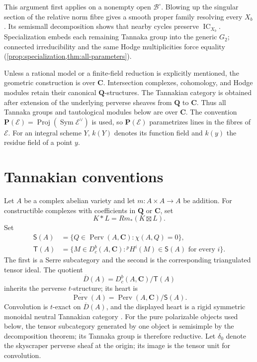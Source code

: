 \documentclass[10pt]{amsart}
\numberwithin{equation}{section}
\theoremstyle{definition}
\theoremstyle{remark}
\newcommand{\CC}{\mathbf C}
\newcommand{\QQ}{\mathbf Q}
\newcommand{\PP}{\mathbf P}
\newcommand{\IC}{\operatorname{IC}}
\newcommand{\cB}{\mathcal B}
\newcommand{\bo}{\boxtimes}
\begin{document}
This argument first applies on a nonempty open $\cB^\circ$.
Blowing up the singular section of the relative norm fibre gives a smooth
proper family resolving every $X_b$.  Its semismall decomposition shows
that nearby cycles preserve $\IC_{X_b}$.  Specialization embeds each
remaining Tannaka group into the generic $G_2$; connected irreducibility
and the same Hodge multiplicities force equality
(\cref{prop:specialization,thm:all-parameters}).

Unless a rational model or a finite-field reduction is explicitly mentioned,
the geometric construction is over $\CC$.  Intersection complexes,
cohomology, and Hodge modules retain their canonical $\QQ$-structures.  The
Tannakian category is obtained after extension of the underlying perverse
sheaves from $\QQ$ to $\CC$.  Thus all Tannaka groups and tautological
modules below are over $\CC$.
The convention $\PP(\mathcal E)=\operatorname{Proj}(\operatorname{Sym}\mathcal E^\vee)$ is used,
so $\PP(\mathcal E)$ parametrizes lines in the fibres of $\mathcal E$.  For
an integral scheme $Y$, $k(Y)$ denotes its function field and $k(y)$ the
residue field of a point $y$.

\section{Tannakian conventions}

Let $A$ be a complex abelian variety and let $m:A\times A\to A$ be addition.
For constructible complexes with coefficients in $\QQ$ or $\CC$, set
\[
K*L=Rm_*(K\bo L).
\]
Set
\[
 \begin{aligned}
 \mathsf S(A)&=\{Q\in\operatorname{Perv}(A,\CC):\chi(A,Q)=0\},\\
 \mathsf T(A)&=\{M\in D_c^b(A,\CC):{}^pH^i(M)\in\mathsf S(A)
                   \text{ for every }i\}.
 \end{aligned}
\]
The first is a Serre subcategory and the second is the corresponding
triangulated tensor ideal.  The quotient
\[
 \overline D(A)=D_c^b(A,\CC)/\mathsf T(A)
\]
inherits the perverse $t$-structure; its heart is
\[
 \overline{\operatorname{Perv}}(A)
   =\operatorname{Perv}(A,\CC)/\mathsf S(A).
\]
Convolution is $t$-exact on $\overline D(A)$, and the displayed heart is a
rigid symmetric monoidal neutral Tannakian category
\cite[Proposition~3.1]{JKLM2025}.  For the pure polarizable objects used
below, the tensor subcategory generated by one object is semisimple by the
decomposition theorem; its Tannaka group is therefore reductive.
Let $\delta_0$ denote the skyscraper perverse sheaf at the origin; its
image is the tensor unit for convolution.
\end{document}
